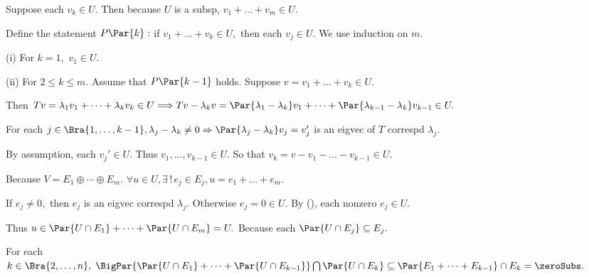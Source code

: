 \par\quad
Suppose each $v_k\in U.$ Then because $U$ is a subsp, $v_1+\dots+v_m\in U.$\par\quad
Define the statement $P\Par{k}:$ if $v_1+\dots+v_k\in U,$ then each $v_j\in U.$ We use induction on $m.$\par\quad
(i) For $k=1,$ $v_1\in U.$\par\quad\Endi
(ii) For $2\leqslant k\leqslant m.$ Assume that $P\Par{k-1}$ holds. Suppose $v=v_1+\dots+v_k\in U.$\par\quad\Hii
Then $Tv=\lambda_1v_1+\dots+\lambda_k v_k\in U\Longrightarrow Tv-\lambda_k v=\Par{\lambda_1-\lambda_k}v_1+\dots+\Par{\lambda_{k-1}-\lambda_k}v_{k-1}\in U.$\par\quad\Hii
For each $j\in\Bra{1,\dots,k-1},\lambda_j-\lambda_{k}\neq 0\Rightarrow\Par{\lambda_j-\lambda_k}v_j=v_j'$ is an eigvec of $T$ correspd $\lambda_j.$\par\quad\Hii
By assumption, each $v_j'\in U.$ Thus $v_1,\dots,v_{k-1}\in U.$ So that $v_k=v-v_1-\dots-v_{k-1}\in U.$\PfEnd
\SepLine[0pt][\Blind{\BulletPointX} ]

\par\quad
Because $V=E_1\oplus\cdots\oplus E_m.$ $\forall u\in U,\exists\,!\,e_j\in E_j,u=e_1+\dots+e_m.$\par\quad
If $e_j\neq 0,$ then $e_j$ is an eigvec correspd $\lambda_j.$ Otherwise $e_j=0\in U.$ By (), each nonzero $e_j\in U.$\par\quad
Thus $u\in\Par{U\cap E_1}+\dots+\Par{U\cap E_m}=U.$ Because each $\Par{U\cap E_j}\subseteq E_j.$\par\quad
For each $k\in\Bra{2,\dots,n},\;\BigPar{\Par{U\cap E_1}+\dots+\Par{U\cap E_{k-1}}}\bigcap\Par{U\cap E_k}\subseteq\Par{E_1+\dots+E_{k-1}}\cap E_k=\zeroSubs.$\PfEnd
\SepLine[0pt][\Blind{\BulletPointX} ]

